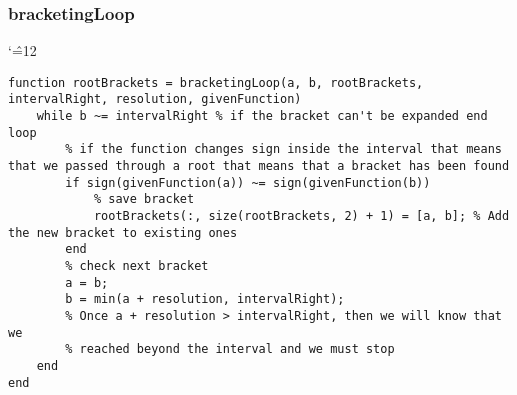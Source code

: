 \documentclass[12pt]{report}
\newenvironment{simplechar}{%
   \catcode`\^=12
}{}
\begin{document}
\subsubsection{bracketingLoop}
\begin{simplechar}
\begin{lstlisting}
function rootBrackets = bracketingLoop(a, b, rootBrackets, intervalRight, resolution, givenFunction)
    while b ~= intervalRight % if the bracket can't be expanded end loop
        % if the function changes sign inside the interval that means that we passed through a root that means that a bracket has been found
        if sign(givenFunction(a)) ~= sign(givenFunction(b))
            % save bracket
            rootBrackets(:, size(rootBrackets, 2) + 1) = [a, b]; % Add the new bracket to existing ones
        end
        % check next bracket
        a = b;
        b = min(a + resolution, intervalRight);
        % Once a + resolution > intervalRight, then we will know that we
        % reached beyond the interval and we must stop
    end
end
\end{lstlisting}
\end{simplechar}

\newpage
\end{document}
